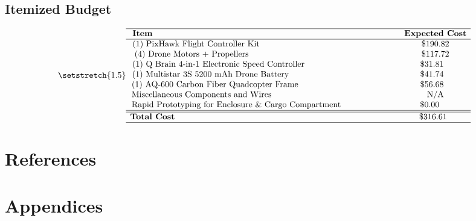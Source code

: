 \documentclass[12pt]{extarticle}
\begin{document}
\subsection{Itemized Budget}

\begin{displaymath}
{\setstretch{1.5}
    \begin{array}{cc}
        \hline
            \textbf{Item}\phantom{aaaaaaaaaaaaaaaaaaaaaaaaaaaaaaaaaaaaaaaaaaaaaaaaaaaaaa} & \textbf{Expected Cost} \\
        \hline
            \text{(1) PixHawk Flight Controller Kit}\phantom{aaaaaaaaaaaaaaaaaaaaaaaaaaaaaa} & \text{\$190.82} \\
            \text{(4) Drone Motors + Propellers}\phantom{aaaaaaaaaaaaaaaaaaaaaaaaaaaaaaaa} & \text{\$117.72} \\
            \text{(1) Q Brain 4-in-1 Electronic Speed Controller}\phantom{aaaaaaaaaaaaaaaaaaaa} & \text{\$31.81}\phantom{a.} \\
            \text{(1) Multistar 3S 5200 mAh Drone Battery}\phantom{aaaaaaaaaaaaaaaaaaaaaaa.} & \text{\$41.74}\phantom{a.} \\
            \text{(1) AQ-600 Carbon Fiber Quadcopter Frame}\phantom{aaaaaaaaaaaaaaaaaaaaa.} & \text{\$56.68}\phantom{a.} \\
            \text{Miscellaneous Components and Wires}\phantom{aaaaaaaaaaaaaaaaaaaaaaaaaaa.} & \text{N/A} \\
            \text{Rapid Prototyping for Enclosure \& Cargo Compartment}\phantom{aaaaaaaaaaaa} & \text{\$0.00}\phantom{aa.} \\
        \hline
        \hline
            \textbf{Total Cost}\phantom{aaaaaaaaaaaaaaaaaaaaaaaaaaaaaaaaaaaaaaaaaaaaaaaaa.} & \text{\$316.61}\phantom{..} \\
        \hline
    \end{array}
}
\end{displaymath}

\section{References}

\nocite{*}
\renewcommand\refname{\vskip -1cm}




\section{Appendices}
\end{document}
